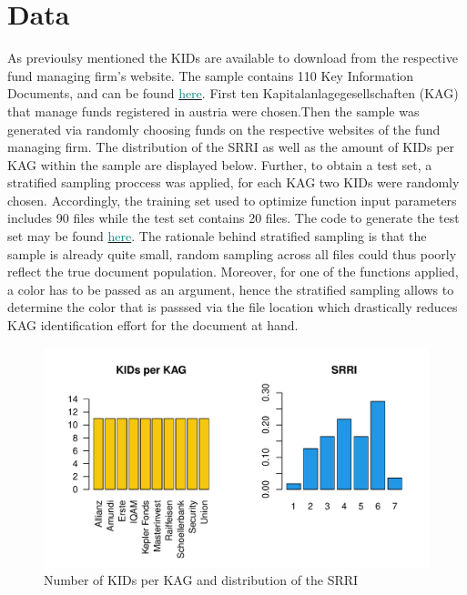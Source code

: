 \documentclass[aodsor,preprint]{imsart}
\numberwithin{equation}{section}
\theoremstyle{plain}
\begin{document}
\section{Data}
As previoulsy mentioned the KIDs are available to download from the respective fund managing firm's website. The  sample contains 110 Key Information Documents, and can be found \href{https://github.com/Base-R-Best-R/KID/tree/main/KIDs}{\textcolor{teal}{here}}. First ten Kapitalanlagegesellschaften (KAG) that manage funds registered in austria were chosen.Then the sample was generated via randomly choosing funds on the respective websites of the fund managing firm. The distribution of the SRRI as well as the amount of KIDs per KAG within the sample are displayed below. Further, to obtain a test set, a stratified sampling proccess was applied, for each KAG two KIDs were randomly chosen. Accordingly, the training set used to optimize function input parameters includes 90 files while the test set contains 20 files. The code to generate the test set may be found \href{https://github.com/Base-R-Best-R/KID/blob/main/Code/Package/DEV/Generate_Test_Sample.R}{\textcolor{teal}{here}}. The rationale behind stratified sampling is that the sample is already quite small, random sampling across all files could thus poorly reflect the true document population. Moreover, for one of the functions applied, a color has to be passed as an argument, hence the stratified sampling allows to determine the color that is passsed via the file location which drastically reduces KAG identification effort for the document at hand. 

\begin{figure}[H]
	\includegraphics[width = 12cm]{data_overview.pdf}
	\caption{Number of KIDs per KAG and distribution of the SRRI}
\end{figure}
\end{document}
